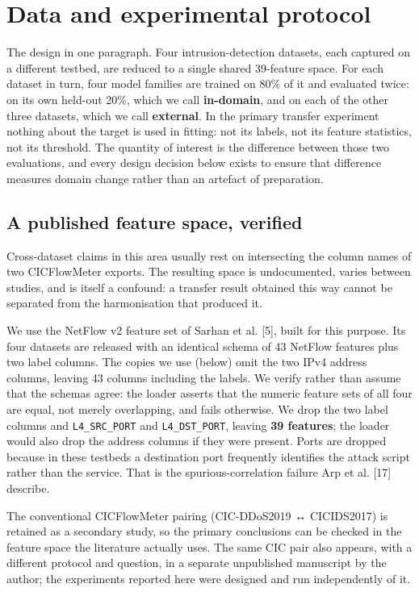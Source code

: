 \documentclass[journal]{IEEEtran}
\begin{document}
\section{Data and experimental protocol}

The design in one paragraph. Four intrusion-detection datasets, each captured on a different testbed, are reduced to a single shared 39-feature space. For each dataset in turn, four model families are trained on 80\% of it and evaluated twice: on its own held-out 20\%, which we call \textbf{in-domain}, and on each of the other three datasets, which we call \textbf{external}. In the primary transfer experiment nothing about the target is used in fitting: not its labels, not its feature statistics, not its threshold. The quantity of interest is the difference between those two evaluations, and every design decision below exists to ensure that difference measures domain change rather than an artefact of preparation.

\subsection{A published feature space, verified}

Cross-dataset claims in this area usually rest on intersecting the column names of two CICFlowMeter exports. The resulting space is undocumented, varies between studies, and is itself a confound: a transfer result obtained this way cannot be separated from the harmonisation that produced it.

We use the NetFlow v2 feature set of Sarhan et al. [5], built for this purpose. Its four datasets are released with an identical schema of 43 NetFlow features plus two label columns. The copies we use (below) omit the two IPv4 address columns, leaving 43 columns including the labels. We verify rather than assume that the schemas agree: the loader asserts that the numeric feature sets of all four are equal, not merely overlapping, and fails otherwise. We drop the two label columns and \texttt{L4\_SRC\_PORT} and \texttt{L4\_DST\_PORT}, leaving \textbf{39 features}; the loader would also drop the address columns if they were present. Ports are dropped because in these testbeds a destination port frequently identifies the attack script rather than the service. That is the spurious-correlation failure Arp et al. [17] describe.

The conventional CICFlowMeter pairing (CIC-DDoS2019 ↔ CICIDS2017) is retained as a secondary study, so the primary conclusions can be checked in the feature space the literature actually uses. The same CIC pair also appears, with a different protocol and question, in a separate unpublished manuscript by the author; the experiments reported here were designed and run independently of it.
\end{document}
